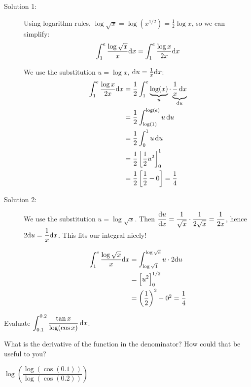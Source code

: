 \begin{solution}
\begin{description}
\item[Solution 1:] Using logarithm rules, $\log\sqrt{x} = \log\left(x^{1/2}\right)=\frac{1}{2}\log x$, so we can simplify:
\[\int_1^e \frac{\log\sqrt{x}}{{x}}\mathrm{d}x =\int_1^e \frac{\log{x}}{{2x}}\mathrm{d}x \]

We use the substitution $u=\log x$, $\mathrm{d}u=\frac{1}{x}\mathrm{d}x$:
\begin{align*}
\int_1^e \frac{\log{x}}{{2x}}\mathrm{d}x&=\frac{1}{2}\int_1^e \underbrace{\log(x)}_{u}\cdot\underbrace{\frac{1}{x}\,\mathrm{d}x}_{\mathrm{d}u}\\
&=\frac{1}{2}\int_{\log(1)}^{\log(e)}u\,\mathrm{d}u\\
&=\frac{1}{2}\int_{0}^{1}u\,\mathrm{d}u\\
&=\frac{1}{2}\left[ \frac{1}{2}u^2\right]_0^1\\
&=\frac{1}{2}\left[\frac{1}{2}-0\right]=\dfrac{1}{4}
\end{align*}

\item[Solution 2:]
We use the substitution $u=\log\sqrt{x}$. Then $\dfrac{\mathrm{d}u}{\mathrm{d}x}=\dfrac{1}{\sqrt{x}}\cdot\dfrac{1}{2\sqrt{x}}=\dfrac{1}{2x}$, hence $2\mathrm{d}u=\dfrac{1}{x}\mathrm{d}x$. This fits our integral nicely!

\begin{align*}
\int_1^e\frac{\log\sqrt{x}}{x}\mathrm{d}x &=
\int_{\log\sqrt{1}}^{\log\sqrt{e}}u\cdot 2\mathrm{d}u \\
&=\Big[u^2\Big]_{0}^{1/2}\\
&=\left(\frac{1}{2}\right)^2-0^2=\frac{1}{4}
\end{align*}
\end{description}
\end{solution}





\begin{question} Evaluate
$\displaystyle\int_{0.1}^{0.2} \frac{\tan x}{\log(\cos x)}\,  \mathrm{d}x$.

\end{question}

\begin{hint}
What is the derivative of the function in the denominator? How could that be useful to you?
\end{hint}

\begin{answer}
$\log\left(\dfrac{\log(\cos(0.1))}{\log(\cos(0.2))}\right)$
\end{answer}

